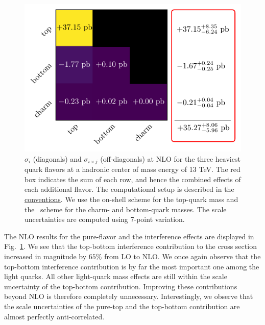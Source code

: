 \begin{figure}[h]
  \centering
  \includegraphics[scale=0.9]{Images/quark_effects_NLO.pdf}
  \caption{$\sigma_{i}$ (diagonals) and $\sigma_{i \times j}$ (off-diagonals) at \acs{NLO} for the three heaviest quark flavors at a hadronic center of mass energy of 13 TeV. The red box indicates the sum of each row, and hence the combined effects of each additional flavor. The computational setup is described in the \hyperref[chap:notation_and_conventions]{conventions}. We use the on-shell scheme for the top-quark mass and the \MS\ scheme for the charm- and bottom-quark masses. The scale uncertainties are computed using 7-point variation.}
  \label{fig:4:quark_effects_NLO}
\end{figure}
The \acs{NLO} results for the pure-flavor and the interference effects are displayed in Fig.~\ref{fig:4:quark_effects_NLO}. We see that the top-bottom interference contribution to the cross section increased in magnitude by $65\%$ from \acs{LO} to \acs{NLO}. We once again observe that the top-bottom interference contribution is by far the most important one among the light quarks. All other light-quark mass effects are still within the scale uncertainty of the top-bottom contribution. Improving these contributions beyond \acs{NLO} is therefore completely unnecessary. Interestingly, we observe that the scale uncertainties of the pure-top and the top-bottom contribution are almost perfectly anti-correlated.

